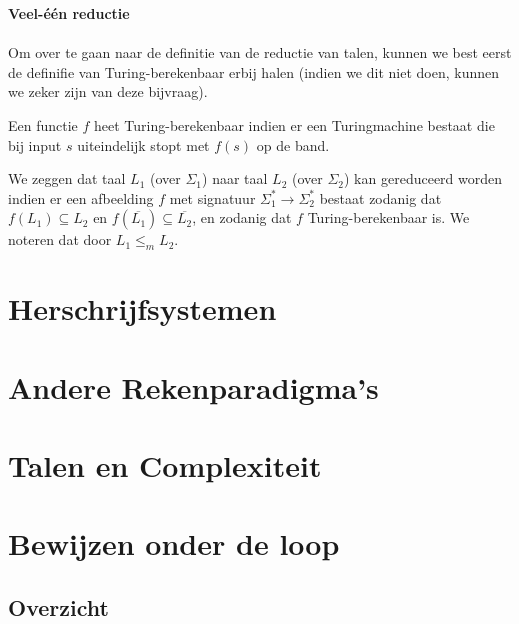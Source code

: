 \documentclass[
10pt,
a4paper,
oneside,
headinclude,footinclude, 
BCOR5mm,
]{scrartcl}
\begin{document}
\vspace{5mm}
\textbf{Veel-\'e\'en reductie} \vspace{-4mm} \\ \\

\noindent Om over te gaan naar de definitie van de reductie van talen, kunnen we best eerst de definifie van Turing-berekenbaar erbij halen (indien we dit niet doen, kunnen we zeker zijn van deze bijvraag).

\begin{theorem}
	Een functie $f$ heet Turing-berekenbaar indien er een Turingmachine bestaat die bij input $s$ uiteindelijk stopt met $f(s)$ op de band.
\end{theorem}

\begin{theorem}
	We zeggen dat taal $L_1$ (over $\Sigma_1$) naar taal $L_2$ (over $\Sigma_2$) kan gereduceerd worden indien er een afbeelding $f$ met signatuur $\Sigma^*_1\longrightarrow \Sigma^*_2$ bestaat zodanig dat $f(L_1) \subseteq L_2$ en $f(\overline{L_1}) \subseteq \overline{L_2}$, en zodanig dat $f$ Turing-berekenbaar is. We noteren dat door $L_1 \leq_m L_2$.
\end{theorem}

\newpage
\section{Herschrijfsystemen}

\lipsum[4-5]

\section{Andere Rekenparadigma's}

\lipsum[10]

\section{Talen en Complexiteit}

\lipsum[11]

\newpage
\section{Bewijzen onder de loop}

\subsection{Overzicht}
\end{document}
